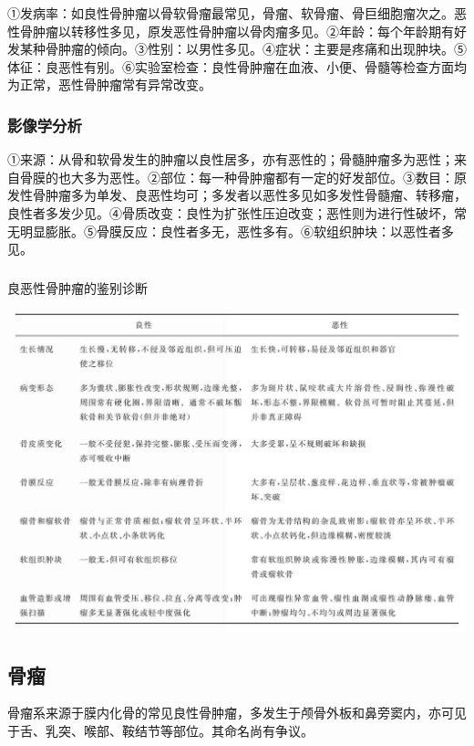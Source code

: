 ①发病率：如良性骨肿瘤以骨软骨瘤最常见，骨瘤、软骨瘤、骨巨细胞瘤次之。恶性骨肿瘤以转移性多见，原发恶性骨肿瘤以骨肉瘤多见。②年龄：每个年龄期有好发某种骨肿瘤的倾向。③性别：以男性多见。④症状：主要是疼痛和出现肿块。⑤体征：良恶性有别。⑥实验室检查：良性骨肿瘤在血液、小便、骨髓等检查方面均为正常，恶性骨肿瘤常有异常改变。

\subsubsection{影像学分析}

①来源：从骨和软骨发生的肿瘤以良性居多，亦有恶性的；骨髓肿瘤多为恶性；来自骨膜的也大多为恶性。②部位：每一种骨肿瘤都有一定的好发部位。③数目：原发性骨肿瘤多为单发、良恶性均可；多发者以恶性多见如多发性骨髓瘤、转移瘤，良性者多发少见。④骨质改变：良性为扩张性压迫改变；恶性则为进行性破坏，常无明显膨胀。⑤骨膜反应：良性者多无，恶性多有。⑥软组织肿块：以恶性者多见。

\subsubsection{}

\begin{table}[htbp]
\centering
\caption{良恶性骨肿瘤的鉴别诊断}
\label{tab22-2}
\includegraphics[width=\textwidth,height=\textheight,keepaspectratio]{./images/Image00434.jpg}
\end{table}

\subsection{骨瘤}

骨瘤系来源于膜内化骨的常见良性骨肿瘤，多发生于颅骨外板和鼻旁窦内，亦可见于舌、乳突、喉部、鞍结节等部位。其命名尚有争议。


